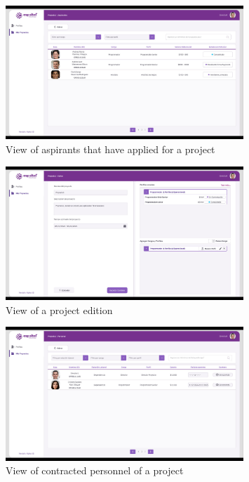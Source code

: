 \documentclass{scrreprt}
\begin{document}
\begin{figure}[H]
	\centering \small
	\includegraphics[width=0.8\textwidth]{WebPrototype/wflow-14.jpeg}
	\caption{View of aspirants that have applied for a project}
\end{figure}

\begin{figure}[H]
	\centering \small
	\includegraphics[width=0.8\textwidth]{WebPrototype/wflow-15.jpeg}
	\caption{View of a project edition}
\end{figure}

\begin{figure}[H]
	\centering \small
	\includegraphics[width=0.8\textwidth]{WebPrototype/wflow-16.jpeg}
	\caption{View of contracted personnel of a project}
\end{figure}
\end{document}
